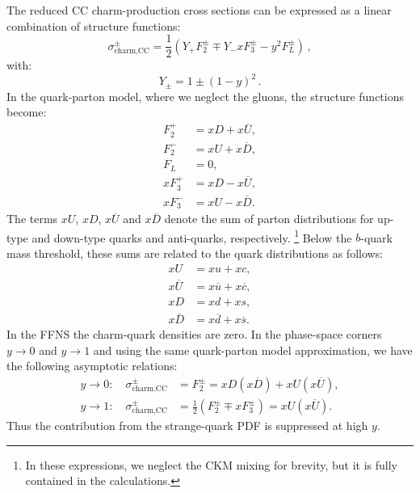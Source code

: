 \documentclass[pdftex,twocolumn,epjc3]{svjour3}          %
\begin{document}
The reduced CC charm-production cross sections can be expressed as a
linear combination of structure functions:
\begin{equation}
  \sigma^{\pm}_{\text{charm,CC}} = \frac12\left(Y_{+}F_2^{\pm} \mp
    Y_{-}xF_3^{\pm} - y^2F_L^{\pm}\right)\,,
\end{equation}
with:
\begin{equation}
  Y_{\pm} = 1 \pm (1-y)^2 \,.
\end{equation}
In the quark-parton model,
where we neglect the gluons, the structure
functions become:
\begin{equation}
\begin{split}
    F_2^{+} &= xD + x\overline{U}, \\
    F_2^{-} &= xU + x\overline{D},\\
    F_L &= 0,\\
    xF_3^{+} &= xD - x\overline{U}, \\
    xF_3^{-} &= xU - x\overline{D}.
\end{split}
\end{equation}
The terms $xU$, $xD$, $x\overline{U}$ and $x\overline{D}$ denote the
sum of parton distributions for up-type and down-type quarks and
anti-quarks, respectively.%
\footnote{In these expressions, we neglect the CKM mixing for brevity, but it is fully contained in the calculations.} 
Below the $b$-quark mass threshold, these
sums are related to the quark distributions as follows:
\begin{equation}
\begin{split}
 xU &= xu + xc , \\
 x\overline{U} &= x\overline{u} + x\overline{c} , \\
 xD &= xd + xs , \\
 x\overline{D} &= x\overline{d} + x\overline{s}.
\end{split}
\end{equation}
In the FFNS the charm-quark densities are zero. In the phase-space
corners $y \to 0$ and $y \to 1$ and using the same quark-parton model approximation, we have the following asymptotic
relations:
\begin{equation}
\begin{split}
 y \to 0: \quad \sigma^{\pm}_{\text{charm,CC}} &= F_2^{\pm} = xD(x\overline{D}) + xU(x\overline{U}), \\[10pt]
 y \to 1: \quad \sigma^{\pm}_{\text{charm,CC}} &= \frac12(F_2^{\pm} \mp xF_3^{\pm}) = xU (x\overline{U}).
\label{eq:y01}
\end{split}
\end{equation}
Thus the contribution from the strange-quark PDF is suppressed at high
$y$.
\end{document}

